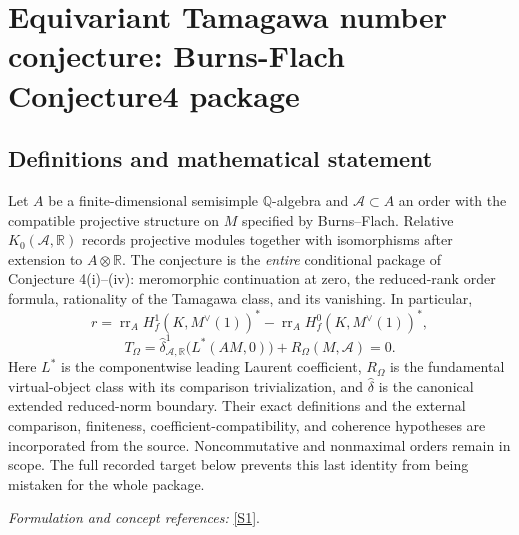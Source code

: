 \documentclass[11pt,a4paper]{article}
\newcommand{\Q}{\mathbb{Q}}
\newcommand{\R}{\mathbb{R}}
\newcommand{\sref}[2]{\hyperlink{source:#1:#2}{[S#2]}}
\numberwithin{equation}{section}
\begin{document}
\setcounter{section}{57}
\clearpage
\section{\texorpdfstring{Equivariant Tamagawa number conjecture: Burns-Flach Conjecture4 package}{Equivariant Tamagawa number conjecture: Burns-Flach Conjecture4 package}}\label{58}
\subsection{Definitions and mathematical statement}
Let $A$ be a finite-dimensional semisimple $\Q$-algebra and $\mathcal A\subset A$ an order with the compatible projective structure on $M$ specified by Burns--Flach. Relative $K_0(\mathcal A,\R)$ records projective modules together with isomorphisms after extension to $A\otimes\R$. The conjecture is the \emph{entire} conditional package of Conjecture 4(i)--(iv): meromorphic continuation at zero, the reduced-rank order formula, rationality of the Tamagawa class, and its vanishing. In particular,
\[
 r=\operatorname{rr}_A H_f^1(K,M^\vee(1))^*
   -\operatorname{rr}_A H_f^0(K,M^\vee(1))^*,
\]
\[
 T_\Omega=\widehat\delta^1_{\mathcal A,\R}\bigl(L^*(AM,0)\bigr)
             +R_\Omega(M,\mathcal A)=0.
\]
Here $L^*$ is the componentwise leading Laurent coefficient, $R_\Omega$ is the fundamental virtual-object class with its comparison trivialization, and $\widehat\delta$ is the canonical extended reduced-norm boundary. Their exact definitions and the external comparison, finiteness, coefficient-compatibility, and coherence hypotheses are incorporated from the source. Noncommutative and nonmaximal orders remain in scope. The full recorded target below prevents this last identity from being mistaken for the whole package.
\par\smallskip\textit{Formulation and concept references:} \sref{58}{1}.
\end{document}
